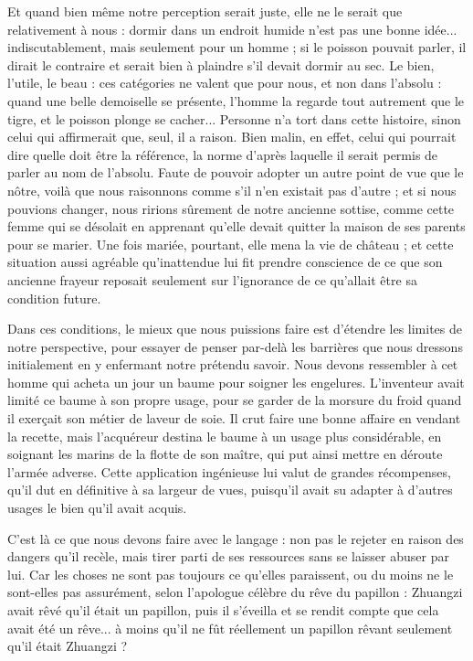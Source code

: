 \documentclass[11pt,a4paper]{article} %
\begin{document}
Et quand bien même notre perception serait juste, elle ne le serait que relativement à
nous : dormir dans un endroit humide n'est pas une bonne idée...
indiscutablement, mais
seulement pour un homme ; si le poisson pouvait parler, il dirait le contraire et serait bien
à plaindre s'il devait dormir au sec.
Le bien, l'utile, le beau : ces catégories ne valent que
pour nous, et non dans l'absolu : quand une belle demoiselle se présente, l'homme la regarde tout autrement que le tigre, et le poisson plonge se cacher...
Personne n'a tort dans
cette histoire, sinon celui qui affirmerait que, seul, il a raison.
Bien malin, en effet, celui
qui pourrait dire quelle doit être la référence, la norme d'après laquelle il serait permis de
parler au nom de l'absolu.
Faute de pouvoir adopter un autre point de vue que le nôtre,
voilà que nous raisonnons comme s'il n'en existait pas d'autre ; et si nous pouvions changer, nous ririons sûrement de notre ancienne sottise, comme cette femme qui se désolait
en apprenant qu'elle devait quitter la maison de ses parents pour se marier.
Une fois mariée, pourtant, elle mena la vie de château ; et cette situation aussi agréable qu'inattendue
lui fit prendre conscience de ce que son ancienne frayeur reposait seulement sur
l'ignorance de ce qu'allait être sa condition future.

Dans ces conditions, le mieux que nous puissions faire est d'étendre les limites de notre
perspective, pour essayer de penser par-delà les barrières que nous dressons initialement
en y enfermant notre prétendu savoir.
Nous devons ressembler à cet homme qui acheta un
jour un baume pour soigner les engelures.
L'inventeur avait limité ce baume à son propre
usage, pour se garder de la morsure du froid quand il exerçait son métier de laveur de
soie.
Il crut faire une bonne affaire en vendant la recette, mais l'acquéreur destina le
baume à un usage plus considérable, en soignant les marins de la flotte de son maître, qui
put ainsi mettre en déroute l'armée adverse.
Cette application ingénieuse lui valut de
grandes récompenses, qu'il dut en définitive à sa largeur de vues, puisqu'il avait su adapter à d'autres usages le bien qu'il avait acquis.

C'est là ce que nous devons faire avec le langage : non pas le rejeter en raison des dangers
qu'il recèle, mais tirer parti de ses ressources sans se laisser abuser par lui.
Car les choses ne sont pas toujours ce qu'elles paraissent, ou du moins ne le sont-elles pas assurément,
selon l'apologue célèbre du rêve du papillon : Zhuangzi avait rêvé qu'il était un papillon,
puis il s'éveilla et se rendit compte que cela avait été un rêve...
à moins qu'il ne fût réellement un papillon rêvant seulement qu'il était Zhuangzi ?
\end{document}
